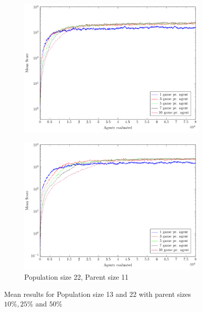 \begin{figure}
\begin{subfigure}[b]{0.49\textwidth}
        \includegraphics[width=\textwidth]{data/ce_population_offspring/22x_split/constant_l22_o5/mean/PlotFile.pdf}
    \end{subfigure}
    \begin{subfigure}[b]{0.49\textwidth}
    	\caption{Population size 22, Parent size 11}
        \includegraphics[width=\textwidth]{data/ce_population_offspring/22x_split/constant_l22_o11/mean/PlotFile.pdf}
    \end{subfigure}
    
    \caption{Mean results for Population size 13 and 22 with parent sizes $10 \% , 25 \%$ and $50 \%$}
\end{figure}

\clearpage

